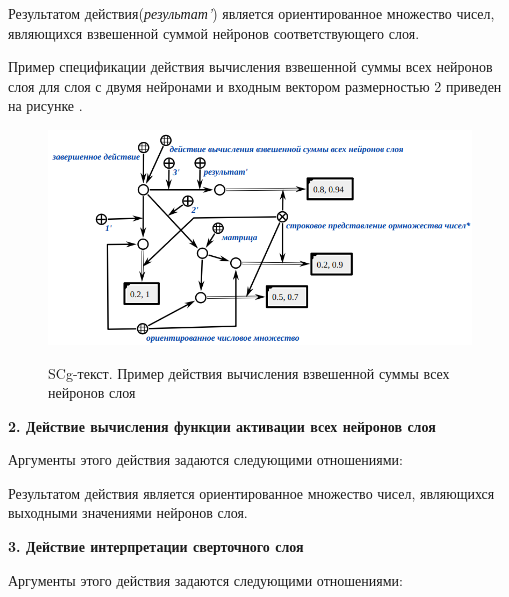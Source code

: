 Результатом действия(\textit{результат'}) является ориентированное множество чисел, являющихся взвешенной суммой нейронов соответствующего слоя.

Пример спецификации действия вычисления взвешенной суммы всех нейронов слоя для слоя с двумя нейронами и входным вектором размерностью 2 приведен на рисунке \textit{}.

\begin{figure}
	\caption{SCg-текст. Пример действия вычисления взвешенной суммы всех нейронов слоя}
	\includegraphics[width=0.95\linewidth]{author/part3/figures/action_weighted_sum.png}
	\label{fig:action_weighted_sum}
\end{figure}


\textbf{2. Действие вычисления функции активации всех нейронов слоя}

Аргументы этого действия задаются следующими отношениями:
\begin{SCn}


\end{SCn}

Результатом действия является ориентированное множество чисел, являющихся выходными значениями нейронов слоя.


\textbf{3. Действие интерпретации сверточного слоя}

Аргументы этого действия задаются следующими отношениями:
\begin{SCn}


\end{SCn}

